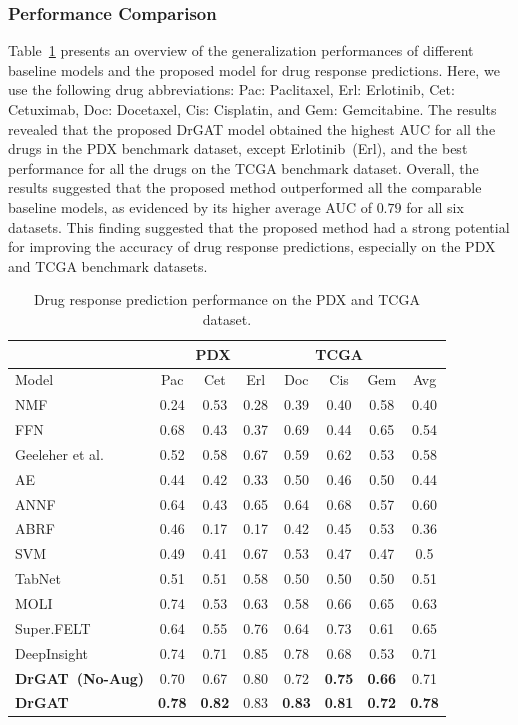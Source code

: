 \documentclass[runningheads]{llncs}
\newcommand{\drdiff}{DrGAT\xspace}
\begin{document}
\subsubsection{Performance Comparison}\label{sec:realperform}

Table~\ref{tab:1} presents an overview of the generalization performances of different baseline models and the proposed model for drug response predictions. Here, we use the following drug abbreviations: Pac: Paclitaxel, Erl: Erlotinib, Cet: Cetuximab, Doc: Docetaxel, Cis: Cisplatin, and Gem: Gemcitabine. The results revealed that the proposed \drdiff model obtained the highest AUC for all the drugs in the PDX benchmark dataset, except Erlotinib~(Erl), and the best performance for all the drugs on the TCGA benchmark dataset. Overall, the results suggested that the proposed method outperformed all the comparable baseline models, as evidenced by its higher average AUC of $0.79$ for all six datasets. This finding suggested that the proposed method had a strong potential for improving the accuracy of drug response predictions, especially on the PDX and TCGA benchmark datasets.

\begin{table}[!h]
\centering
  \begin{tabular}{|l|ccc|ccc|c|}
    \hline
    & \multicolumn{3}{c|}{PDX} & \multicolumn{3}{c|}{TCGA} & \\
    \hline
  Model & Pac & Cet & Erl & Doc & Cis & Gem & Avg \\
    \hline
NMF & 0.24 & 0.53 & 0.28 & 0.39 & 0.40 & 0.58 & 0.40 \\
FFN & 0.68 & 0.43 & 0.37 & 0.69 & 0.44 & 0.65 & 0.54 \\
Geeleher et al. & 0.52 & 0.58 & 0.67 & 0.59 & 0.62 & 0.53 & 0.58 \\
AE & 0.44 & 0.42 & 0.33 & 0.50 & 0.46 & 0.50 & 0.44 \\
ANNF & 0.64 & 0.43 & 0.65 & 0.64 & 0.68 & 0.57 & 0.60 \\
ABRF & 0.46 & 0.17 & 0.17 & 0.42 & 0.45 & 0.53 & 0.36 \\
SVM & 0.49 & 0.41 & 0.67 & 0.53 & 0.47 & 0.47 & 0.5 \\
TabNet & 0.51 & 0.51 & 0.58 & 0.50 & 0.50 & 0.50 & 0.51 \\
MOLI & 0.74 & 0.53 & 0.63 & 0.58 & 0.66 & 0.65 & 0.63 \\
Super.FELT & 0.64 & 0.55 & 0.76 & 0.64 & 0.73 & 0.61 & 0.65 \\
DeepInsight & 0.74 & 0.71 & 0.85 & 0.78 & 0.68 & 0.53 & 0.71 \\
\hline
\textbf{\drdiff~(No-Aug)} & 0.70 & 0.67 & 0.80 & 0.72 & \textbf{0.75} & \textbf{0.66} & 0.71 \\
\textbf{\drdiff} & \textbf{0.78} & \textbf{0.82} & 0.83 & \textbf{0.83} & \textbf{0.81} & \textbf{0.72} & \textbf{0.78} \\
\hline
\end{tabular}
\caption{Drug response prediction performance on the PDX and TCGA dataset.}
\label{tab:1}
\end{table}
\end{document}
